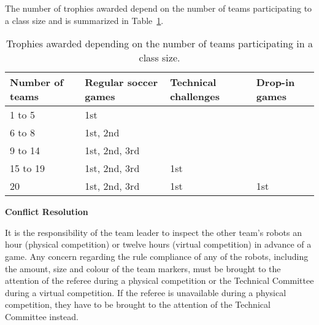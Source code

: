 \bigskip


  The number of trophies awarded depend on the number of teams participating to
  a class size and is summarized in Table~\ref{tab:trophies}.


\begin{table}
  \centering
  \begin{tabular}{llll}
    Number of teams & Regular soccer games & Technical challenges & Drop-in games\\
    \hline
    1 to 5 & 1st & & \\
    6 to 8 & 1st, 2nd & & \\
    9 to 14 & 1st, 2nd, 3rd & & \\
    15 to 19 & 1st, 2nd, 3rd & 1st & \\
    20 & 1st, 2nd, 3rd & 1st & 1st \\
  \end{tabular}
  \caption{Trophies awarded depending on the number of teams participating
  in a class size.}
  \label{tab:trophies}
\end{table}

\bigskip


{\bfseries Conflict Resolution}

\headlinebox

It is the responsibility of the team leader to inspect the other team's
robots an hour (physical competition) or twelve hours (virtual competition) in advance of a game.
Any concern regarding the rule compliance of any of the
robots, including the amount, size and colour of the team markers, must be
brought to the attention of the referee during a physical competition or the Technical Committee during a virtual competition.
If the referee is unavailable during a physical competition, they have to be brought to the attention
  of the Technical Committee instead.



\bigskip

